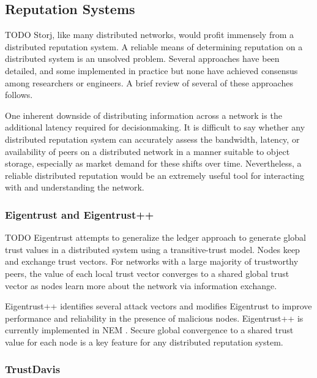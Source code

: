\documentclass[a4paper,10pt]{article}
\newcommand{\todo}[1]{{\color{red} TODO #1}}
\begin{document}
\subsection{Reputation Systems}

\todo{
Storj, like many distributed networks, would profit immensely from a distributed
reputation system. A reliable means of determining reputation on a distributed
system is an unsolved problem. Several approaches have been detailed, and some
implemented in practice but none have achieved consensus among researchers or
engineers. A brief review of several of these approaches follows.

One inherent downside of distributing information across a network is the
additional latency required for decisionmaking. It is difficult to say whether
any distributed reputation system can accurately assess the bandwidth, latency,
or availability of peers on a distributed network in a manner suitable to object
storage, especially as market demand for these shifts over time. Nevertheless, a
reliable distributed reputation would be an extremely useful tool for
interacting with and understanding the network.
}

\subsubsection{Eigentrust and Eigentrust++}

\todo{
Eigentrust \cite{19} attempts to generalize the ledger approach to generate
global trust values in a distributed system using a transitive-trust model.
Nodes keep and exchange trust vectors. For networks with a large majority of
trustworthy peers, the value of each local trust vector converges to a shared
global trust vector as nodes learn more about the network via information
exchange.

Eigentrust++ \cite{20} identifies several attack vectors and modifies Eigentrust
to improve performance and reliability in the presence of malicious nodes.
Eigentrust++ is currently implemented in NEM \cite{21}. Secure global
convergence to a shared trust value for each node is a key feature for any
distributed reputation system.
}

\subsubsection{TrustDavis}
\end{document}
